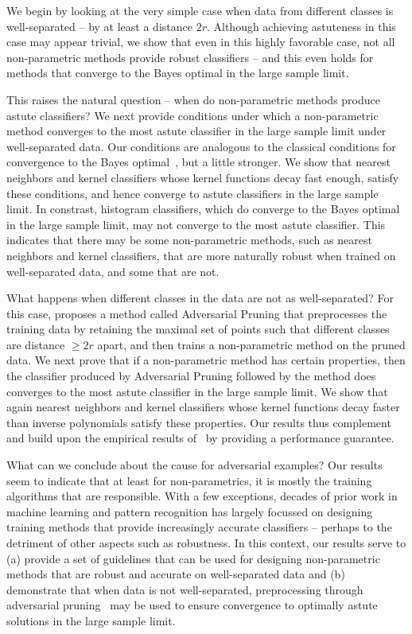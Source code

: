  We begin by looking at the very simple case when data from different classes is well-separated -- by at least a distance $2r$. Although achieving astuteness in this case may appear trivial, we show that even in this highly favorable case, not all non-parametric methods provide robust classifiers -- and this even holds for methods that converge to the Bayes optimal in the large sample limit.  

This raises the natural question -- when do non-parametric methods produce astute classifiers? We next provide conditions under which a non-parametric method converges to the most astute classifier in the large sample limit under well-separated data. Our conditions are analogous to the classical conditions for convergence to the Bayes optimal~\cite{devroye96, Stone77}, but a little stronger. We show that nearest neighbors and kernel classifiers whose kernel functions decay fast enough, satisfy these conditions, and hence converge to astute classifiers in the large sample limit. In constrast, histogram classifiers, which do converge to the Bayes optimal in the large sample limit, may not converge to the most astute classifier. This indicates that there may be some non-parametric methods, such as nearest neighbors and kernel classifiers, that are more naturally robust when trained on well-separated data, and some that are not.

What happens when different classes in the data are not as well-separated? For this case, \cite{YRWC19} proposes a method called Adversarial Pruning that preprocesses the training data by retaining the maximal set of points such that different classes are distance $\geq 2r$ apart, and then trains a non-parametric method on the pruned data. We next prove that if a non-parametric method has certain properties, then the classifier produced by Adversarial Pruning followed by the method does converges to the most astute classifier in the large sample limit. We show that again nearest neighbors and kernel classifiers whose kernel functions decay faster than inverse polynomials satisfy these properties. Our results thus complement and build upon the empirical results of~\cite{YRWC19} by providing a performance guarantee. 

What can we conclude about the cause for adversarial examples? Our results seem to indicate that at least for non-parametrics, it is mostly the training algorithms that are responsible. With a few exceptions, decades of prior work in machine learning and pattern recognition has largely focussed on designing training methods that provide increasingly accurate classifiers -- perhaps to the detriment of other aspects such as robustness. In this context, our results serve to (a) provide a set of guidelines that can be used for designing non-parametric methods that are robust and accurate on well-separated data and (b) demonstrate that when data is not well-separated, preprocessing through adversarial pruning~\cite{YRWC19} may be used to ensure convergence to optimally astute solutions in the large sample limit. 

